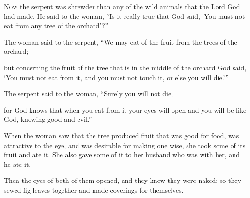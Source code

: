 \begin{scripture}
 \allowchapbreak\hypertarget{ch-genesis-3}{}\lettrine[lines=5]{\color{pentateuch}N}{\textsc{ow}} the serpent was shrewder than any of the wild animals that the Lord God had made. He said to the woman, ``Is it really true that God said, `You must not eat from any tree of the orchard'?''\everypar{}
 The woman said to the serpent, ``We may eat of the fruit from the trees of the orchard;
 but concerning the fruit of the tree that is in the middle of the orchard God said, `You must not eat from it, and you must not touch it, or else you will die.'''
 The serpent said to the woman, ``Surely you will not die,
 for God knows that when you eat from it your eyes will open and you will be like God, knowing good and evil.''
\everypar{}

 When the woman saw that the tree produced fruit that was good for food, was attractive to the eye, and was desirable for making one wise, she took some of its fruit and ate it. She also gave some of it to her husband who was with her, and he ate it.
 Then the eyes of both of them opened, and they knew they were naked; so they sewed fig leaves together and made coverings for themselves.
\everypar{}


\end{scripture}

